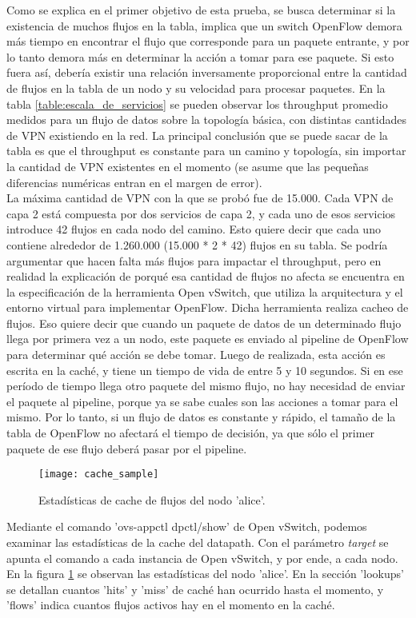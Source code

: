 Como se explica en el primer objetivo de esta prueba, se busca determinar si la existencia de muchos flujos en la tabla, implica que un switch OpenFlow demora más tiempo en encontrar el flujo que corresponde para un paquete entrante, y por lo tanto demora más en determinar la acción a tomar para ese paquete. Si esto fuera así, debería existir una relación inversamente proporcional entre la cantidad de flujos en la tabla de un nodo y su velocidad para procesar paquetes. En la tabla \ref{table:escala_de_servicios} se pueden observar los throughput promedio medidos para un flujo de datos sobre la topología básica, con distintas cantidades de VPN existiendo en la red. La principal conclusión que se puede sacar de la tabla es que el throughput es constante para un camino y topología, sin importar la cantidad de VPN existentes en el momento (se asume que las pequeñas diferencias numéricas entran en el margen de error). \\
La máxima cantidad de VPN con la que se probó fue de 15.000. Cada VPN de capa 2 está compuesta por dos servicios de capa 2, y cada uno de esos servicios introduce 42 flujos en cada nodo del camino. Esto quiere decir que cada uno contiene alrededor de 1.260.000 (15.000 * 2 * 42) flujos en su tabla. Se podría argumentar que hacen falta más flujos para impactar el throughput, pero en realidad la explicación de porqué esa cantidad de flujos no afecta se encuentra en la especificación de la herramienta Open vSwitch, que utiliza la arquitectura y el entorno virtual para implementar OpenFlow. Dicha herramienta realiza cacheo de flujos. Eso quiere decir que cuando un paquete de datos de un determinado flujo llega por primera vez a un nodo, este paquete es enviado al pipeline de OpenFlow para determinar qué acción se debe tomar. Luego de realizada, esta acción es escrita en la caché, y tiene un tiempo de vida de entre 5 y 10 segundos. Si en ese período de tiempo llega otro paquete del mismo flujo, no hay necesidad de enviar el paquete al pipeline, porque ya se sabe cuales son las acciones a tomar para el mismo. Por lo tanto, si un flujo de datos es constante y rápido, el tamaño de la tabla de OpenFlow no afectará el tiempo de decisión, ya que sólo el primer paquete de ese flujo deberá pasar por el pipeline. \\
\begin{figure}[t]
	\caption{Estadísticas de cache de flujos del nodo 'alice'.}
	\texttt{[image: cache\_sample]}
	\centering
	\label{fig:cache_sample}
\end{figure}
Mediante el comando 'ovs-appctl dpctl/show' de Open vSwitch, podemos examinar las estadísticas de la cache del datapath. Con el parámetro \textit{target} se apunta el comando a cada instancia de Open vSwitch, y por ende, a cada nodo. En la figura \ref{fig:cache_sample} se observan las estadísticas del nodo 'alice'. En la sección 'lookups' se detallan cuantos 'hits' y 'miss' de caché han ocurrido hasta el momento, y 'flows' indica cuantos flujos activos hay en el momento en la caché. \\

